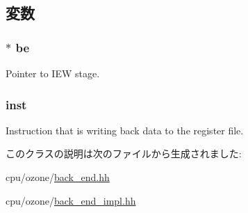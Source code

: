 \subsection{変数}
\hypertarget{classBackEnd_1_1LdWritebackEvent_a84f815aa1fa864ba2e6d75f5ad2b52d1}{
\subsubsection[{be}]{$\ast$ {\bf be}}}
\label{classBackEnd_1_1LdWritebackEvent_a84f815aa1fa864ba2e6d75f5ad2b52d1}
Pointer to IEW stage. \hypertarget{classBackEnd_1_1LdWritebackEvent_af5d4fb974eeb4507d4c837d365d0cefc}{
\subsubsection[{inst}]{ {\bf inst}}}
\label{classBackEnd_1_1LdWritebackEvent_af5d4fb974eeb4507d4c837d365d0cefc}
Instruction that is writing back data to the register file. 

このクラスの説明は次のファイルから生成されました:\begin{DoxyCompactItemize}
\item 
cpu/ozone/\hyperlink{back__end_8hh}{back\_\-end.hh}\item 
cpu/ozone/\hyperlink{back__end__impl_8hh}{back\_\-end\_\-impl.hh}\end{DoxyCompactItemize}

